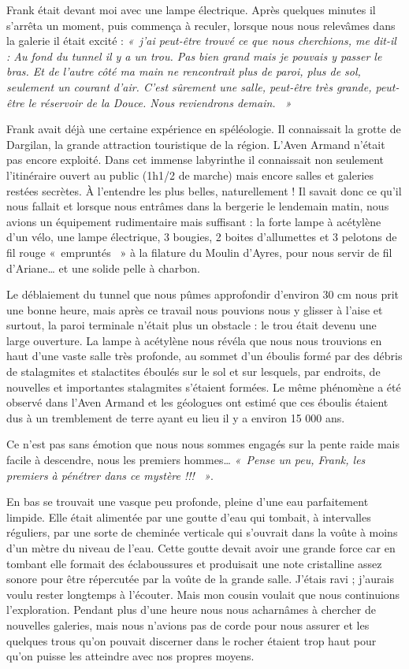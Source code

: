Frank était devant moi avec une lampe électrique. Après quelques minutes il s’arrêta un
moment, puis commença à reculer, lorsque nous nous relevâmes dans la galerie il était excité :
\textit{«~j’ai peut-être trouvé ce que nous cherchions, me dit-il : Au fond du tunnel il y a un trou.
Pas bien grand mais je pouvais y passer le bras. Et de l’autre côté ma main ne rencontrait
plus de paroi, plus de sol, seulement un courant d’air. C’est sûrement une salle, peut-être
très grande, peut-être le réservoir de la Douce. Nous reviendrons demain. ~»}

Frank avait déjà une certaine expérience en spéléologie. Il connaissait la grotte de Dargilan, la
grande attraction touristique de la région. L’Aven Armand n’était pas encore exploité. Dans
cet immense labyrinthe il connaissait non seulement l’itinéraire ouvert au public (1h1/2 de
marche) mais encore salles et galeries restées secrètes. À l’entendre les plus belles,
naturellement ! Il savait donc ce qu’il nous fallait et lorsque nous entrâmes dans la bergerie le
lendemain matin, nous avions un équipement rudimentaire mais suffisant : la forte lampe à
acétylène d’un vélo, une lampe électrique, 3 bougies, 2 boites d’allumettes et 3 pelotons de fil
rouge «~empruntés ~» à la filature du Moulin d’Ayres, pour nous servir de fil d’Ariane… et une
solide pelle à charbon.

Le déblaiement du tunnel que nous pûmes approfondir d’environ 30 cm nous prit une bonne
heure, mais après ce travail nous pouvions nous y glisser à l’aise et surtout, la paroi terminale
n’était plus un obstacle : le trou était devenu une large ouverture. La lampe à acétylène nous
révéla que nous nous trouvions en haut d’une vaste salle très profonde, au sommet d’un
éboulis formé par des débris de stalagmites et stalactites éboulés sur le sol et sur lesquels, par
endroits, de nouvelles et importantes stalagmites s’étaient formées. Le même phénomène a été
observé dans l’Aven Armand et les géologues ont estimé que ces éboulis étaient dus à un
tremblement de terre ayant eu lieu il y a environ 15 000 ans.

Ce n’est pas sans émotion que nous nous sommes engagés sur la pente raide mais facile à
descendre, nous les premiers hommes… \textit{«~Pense un peu, Frank, les premiers à pénétrer dans
ce mystère !!! ~»}.

En bas se trouvait une vasque peu profonde, pleine d’une eau parfaitement limpide. Elle était
alimentée par une goutte d’eau qui tombait, à intervalles réguliers, par une sorte de cheminée
verticale qui s’ouvrait dans la voûte à moins d’un mètre du niveau de l’eau. Cette goutte
devait avoir une grande force car en tombant elle formait des éclaboussures et produisait une
note cristalline assez sonore pour être répercutée par la voûte de la grande salle. J’étais ravi ;
j’aurais voulu rester longtemps à l’écouter. Mais mon cousin voulait que nous continuions
l’exploration. Pendant plus d’une heure nous nous acharnâmes à chercher de nouvelles
galeries, mais nous n’avions pas de corde pour nous assurer et les quelques trous qu’on
pouvait discerner dans le rocher étaient trop haut pour qu’on puisse les atteindre avec nos
propres moyens.

